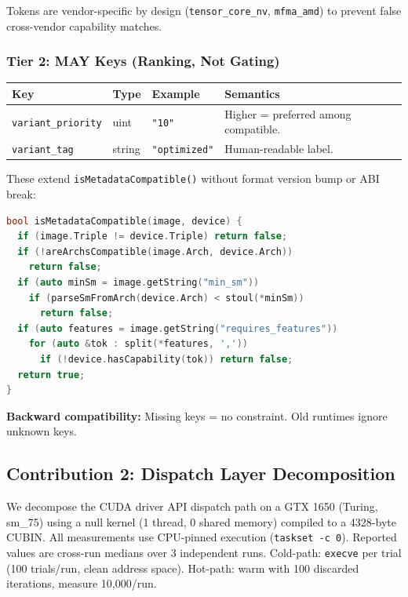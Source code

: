 \documentclass[10pt]{article}
\begin{document}
Tokens are vendor-specific by design (\texttt{tensor\_core\_nv}, \texttt{mfma\_amd}) to prevent false cross-vendor capability matches.

\subsubsection{Tier 2: MAY Keys (Ranking, Not Gating)}

\begin{center}
\footnotesize
\begin{tabular}{llll}
  \toprule
  Key & Type & Example & Semantics \\
  \midrule
  \texttt{variant\_priority} & uint & \texttt{"10"} & Higher = preferred among compatible. \\
  \texttt{variant\_tag} & string & \texttt{"optimized"} & Human-readable label. \\
  \bottomrule
\end{tabular}
\normalsize
\end{center}

These extend \texttt{isMetadataCompatible()} without format version bump or ABI break:

\begin{lstlisting}[language=C++]
bool isMetadataCompatible(image, device) {
  if (image.Triple != device.Triple) return false;
  if (!areArchsCompatible(image.Arch, device.Arch))
    return false;
  if (auto minSm = image.getString("min_sm"))
    if (parseSmFromArch(device.Arch) < stoul(*minSm))
      return false;
  if (auto features = image.getString("requires_features"))
    for (auto &tok : split(*features, ','))
      if (!device.hasCapability(tok)) return false;
  return true;
}
\end{lstlisting}

\textbf{Backward compatibility:} Missing keys = no constraint. Old runtimes ignore unknown keys.

\subsection{Contribution 2: Dispatch Layer Decomposition}

We decompose the CUDA driver API dispatch path on a GTX 1650 (Turing, sm\_75) using a null kernel (1 thread, 0 shared memory) compiled to a 4328-byte CUBIN.
All measurements use CPU-pinned execution (\texttt{taskset -c 0}).
Reported values are cross-run medians over 3 independent runs.
Cold-path: \texttt{execve} per trial (100 trials/run, clean address space).
Hot-path: warm with 100 discarded iterations, measure 10,000/run.
\end{document}
